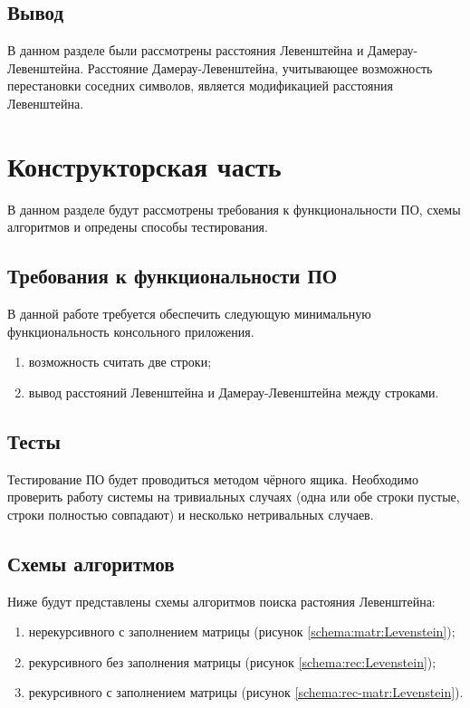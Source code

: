 \documentclass[utf8x, 12pt]{G7-32}
\begin{document}
		\section{Вывод}
		В данном разделе были рассмотрены расстояния Левенштейна и Дамерау-Левенштейна. Расстояние Дамерау-Левенштейна, учитывающее возможность перестановки соседних символов, является модификацией расстояния Левенштейна. 




\chapter{Конструкторская часть}
    В данном разделе будут рассмотрены требования к функциональности ПО, схемы алгоритмов
    и опредены способы тестирования.

    \section{Требования к функциональности ПО}
        В данной работе требуется обеспечить следующую минимальную функциональность консольного приложения.
            \begin{enumerate}
                \item возможность считать две строки;
                \item вывод расстояний Левенштейна и Дамерау-Левенштейна между строками.
            \end{enumerate}
\section{Тесты}
    Тестирование ПО будет проводиться методом чёрного ящика. Необходимо проверить работу системы 
    на тривиальных случаях (одна или обе строки пустые, строки полностью совпадают) 
    и несколько нетривальных случаев.

    \section{Схемы алгоритмов}
        Ниже будут представлены схемы алгоритмов поиска растояния Левенштейна: \begin{enumerate}
            \item нерекурсивного с заполнением матрицы (рисунок \ref{schema:matr:Levenstein});
            \item рекурсивного без заполнения матрицы (рисунок \ref{schema:rec:Levenstein});
            \item рекурсивного с заполнением матрицы (рисунок \ref{schema:rec-matr:Levenstein}).
        \end{enumerate}
\end{document}
